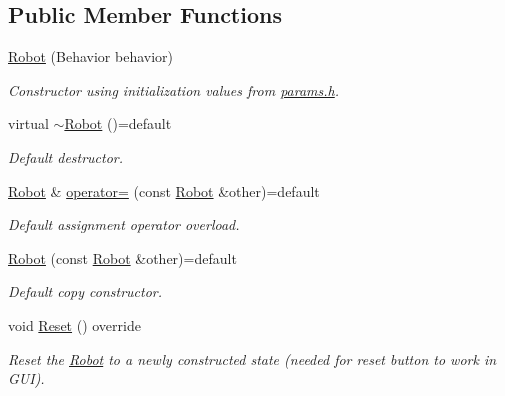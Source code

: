 \subsection*{Public Member Functions}
\begin{DoxyCompactItemize}
\item 
\mbox{\label{class_robot_afc21c5c822196c987a73d35d02c0c26d}} 
\mbox{\hyperlink{class_robot_afc21c5c822196c987a73d35d02c0c26d}{Robot}} (Behavior behavior)
\begin{DoxyCompactList}\small\item\em Constructor using initialization values from \mbox{\hyperlink{params_8h}{params.\+h}}. \end{DoxyCompactList}\item 
\mbox{\label{class_robot_a4ed87722425dbfdc35631a0b8b58859f}} 
virtual \mbox{\hyperlink{class_robot_a4ed87722425dbfdc35631a0b8b58859f}{$\sim$\+Robot}} ()=default
\begin{DoxyCompactList}\small\item\em Default destructor. \end{DoxyCompactList}\item 
\mbox{\label{class_robot_a69f171c4965ac4523cd95e2191405d37}} 
\mbox{\hyperlink{class_robot}{Robot}} \& \mbox{\hyperlink{class_robot_a69f171c4965ac4523cd95e2191405d37}{operator=}} (const \mbox{\hyperlink{class_robot}{Robot}} \&other)=default
\begin{DoxyCompactList}\small\item\em Default assignment operator overload. \end{DoxyCompactList}\item 
\mbox{\label{class_robot_a87ee951bb2c663a8bb427fdd2928a934}} 
\mbox{\hyperlink{class_robot_a87ee951bb2c663a8bb427fdd2928a934}{Robot}} (const \mbox{\hyperlink{class_robot}{Robot}} \&other)=default
\begin{DoxyCompactList}\small\item\em Default copy constructor. \end{DoxyCompactList}\item 
\mbox{\label{class_robot_af597fd14927d2cd5308ded62f4e54e29}} 
void \mbox{\hyperlink{class_robot_af597fd14927d2cd5308ded62f4e54e29}{Reset}} () override
\begin{DoxyCompactList}\small\item\em Reset the \mbox{\hyperlink{class_robot}{Robot}} to a newly constructed state (needed for reset button to work in G\+UI). \end{DoxyCompactList}\item 

\end{DoxyCompactItemize}
